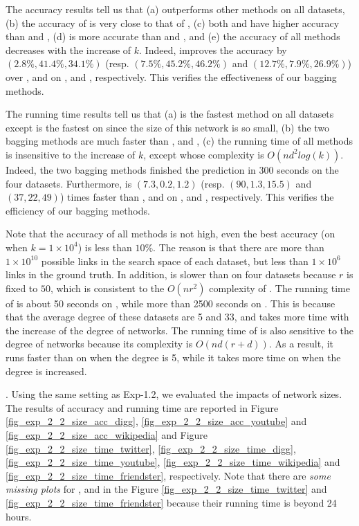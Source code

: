 The accuracy results tell us that (a) \Biased outperforms other methods on all datasets,
(b) the accuracy of \Biasedp is very close to that of \Biased, (c) both
\Biased and \Biasedp have higher accuracy than \Aa and \BIGCLAM, (d) \NMF is more accurate
than \Aa and \BIGCLAM, and (e) the accuracy of all methods decreases with the increase of $k$.
Indeed, \Biased improves the accuracy by $(2.8\%, 41.4\%, 34.1\%)$ (resp. $(7.5\%, 45.2\%, 46.2\%)$
and $(12.7\%, 7.9\%, 26.9\%)$) over \NMF, \Aa and \BIGCLAM on \Digg, \YouTube and \Wikipedia,
respectively. This verifies the effectiveness of our bagging methods.


The running time results tell us that (a) \Biasedp is the fastest method on all
datasets except \Aa is the fastest on \Digg since the size of this network is so
small, (b) the two bagging methods are much faster than \NMF, \Aa and \BIGCLAM,
(c) the running time of all methods is insensitive to the increase of $k$,
except \Aa whose complexity is $O(nd^2log(k))$.
Indeed, the two bagging methods finished the prediction in 300 seconds on the four datasets.
Furthermore, \Biasedp is $(7.3, 0.2, 1.2)$ (resp. $(90, 1.3, 15.5)$ and $(37, 22, 49)$)
times faster than \NMF, \Aa and \BIGCLAM on
\Digg, \YouTube and \Wikipedia, respectively.
This verifies the efficiency of our bagging methods.


Note that the accuracy of all methods is not high, even the best
accuracy (\Biasedp on \Digg when $k = 1\times 10^4$) is less than $10\%$. The reason is that
there are more than $1\times 10^{10}$ possible links in the search space of each dataset,
but less than $1\times 10^6$ links in the ground truth.
In addition, \NMF is slower than \Aa on four datasets because $r$ is fixed to $50$,
which is consistent to the $O(nr^2)$ complexity of \NMF.
The running time of \Aa is about 50 seconds on \YouTube,
while more than 2500 seconds on \Wikipedia.
This is because that the average degree of these datasets are 5 and 33,
and \Aa takes more time with the increase of the degree of networks.
The running time of \BIGCLAM is also sensitive to the degree of networks because its complexity is $O(nd(r + d))$.
As a result, it runs faster than
\NMF on \YouTube when the degree is 5, while it takes more time on \Wikipedia
when the degree is increased.








. Using the same setting as Exp-1.2, we
evaluated the impacts of network sizes. The results of accuracy and running time
are reported in Figure \ref{fig_exp_2_2_size_acc_digg}, \ref{fig_exp_2_2_size_acc_youtube} and
\ref{fig_exp_2_2_size_acc_wikipedia}
and Figure \ref{fig_exp_2_2_size_time_twitter}, \ref{fig_exp_2_2_size_time_digg},
\ref{fig_exp_2_2_size_time_youtube}, \ref{fig_exp_2_2_size_time_wikipedia} and
\ref{fig_exp_2_2_size_time_friendster}, respectively.
Note that there are {\em some missing plots} for \NMF, \Aa and
\BIGCLAM in the Figure \ref{fig_exp_2_2_size_time_twitter} and
\ref{fig_exp_2_2_size_time_friendster} because their running time
is beyond 24 hours.



